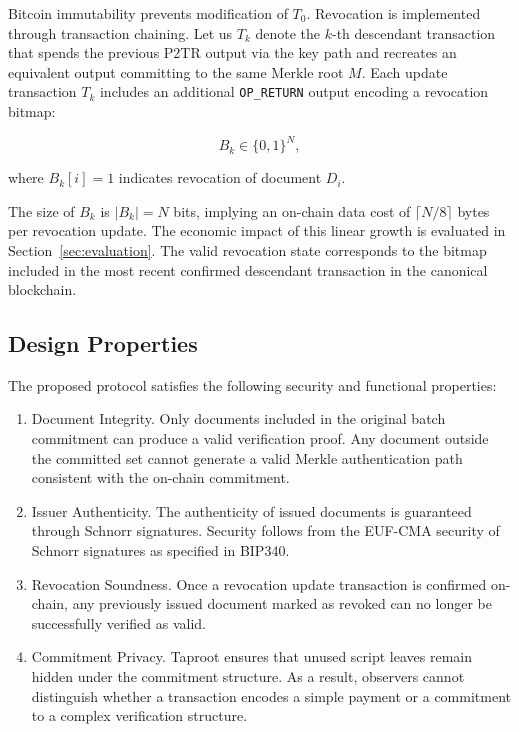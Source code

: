 \documentclass[preprint,12pt]{elsarticle}
\begin{document}
Bitcoin immutability prevents modification of $T_0$.  Revocation is implemented through transaction chaining. Let us $T_k$ denote the $k$-th descendant transaction that spends the previous P2TR output via the key path and recreates an equivalent output committing to the same Merkle root $M$. Each update transaction $T_k$ includes an additional \texttt{OP\_RETURN} output encoding a revocation bitmap:

\begin{equation}
B_k \in \{0,1\}^N,
\end{equation}

where $B_k[i]=1$ indicates revocation of document $D_i$.

The size of $B_k$ is $|B_k| = N$ bits, implying an on-chain data cost of $\lceil N/8 \rceil$ bytes per revocation update.  
The economic impact of this linear growth is evaluated in Section~\ref{sec:evaluation}.
The valid revocation state corresponds to the bitmap included in the most recent confirmed descendant transaction in the canonical blockchain.


\subsection{Design Properties}

The proposed protocol satisfies the following security and functional properties:

\begin{enumerate}
    \item Document Integrity.
    Only documents included in the original batch commitment can produce a valid verification proof. 
    Any document outside the committed set cannot generate a valid Merkle authentication path consistent with the on-chain commitment.

    \item Issuer Authenticity. 
    The authenticity of issued documents is guaranteed through Schnorr signatures. 
    Security follows from the EUF-CMA  security of Schnorr signatures as specified in BIP340.

    \item Revocation Soundness. 
    Once a revocation update transaction is confirmed on-chain, any previously issued document marked as revoked can no longer be successfully verified as valid.

    \item Commitment Privacy. 
    Taproot ensures that unused script leaves remain hidden under the commitment structure. 
    As a result, observers cannot distinguish whether a transaction encodes a simple payment or a commitment to a complex verification structure.
\end{enumerate}
\end{document}
